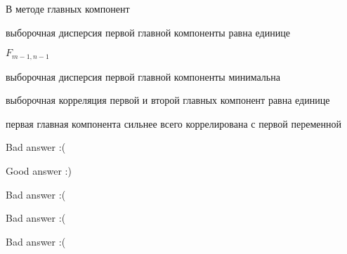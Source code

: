 
\begin{question}
В методе главных компонент
\begin{answerlist}
  \item выборочная дисперсия первой главной компоненты равна единице
  \item \(F_{m-1,n-1}\)
  \item выборочная дисперсия первой главной компоненты минимальна
  \item выборочная корреляция первой и второй главных компонент равна единице
  \item первая главная компонента сильнее всего коррелирована с первой
переменной
\end{answerlist}
\end{question}

\begin{solution}
\begin{answerlist}
  \item Bad answer :(
  \item Good answer :)
  \item Bad answer :(
  \item Bad answer :(
  \item Bad answer :(
\end{answerlist}
\end{solution}

